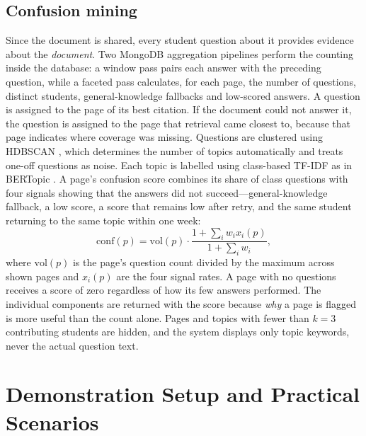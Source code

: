 \documentclass[conference]{IEEEtran}
\begin{document}
\subsection{Confusion mining}
\label{sec:mining}

Since the document is shared, every student question about it provides evidence about the
\emph{document}. Two MongoDB aggregation pipelines perform the counting inside the database: a
window pass pairs each answer with the preceding question, while a faceted pass calculates, for each
page, the number of questions, distinct students, general-knowledge fallbacks and low-scored
answers. A question is assigned to the page of its best citation. If the document could not answer
it, the question is assigned to the page that retrieval came closest to, because that page indicates
where coverage was missing. Questions are clustered using HDBSCAN
\cite{campello2013hdbscan}, which determines the number of topics automatically and treats one-off
questions as noise. Each topic is labelled using class-based TF-IDF as in BERTopic
\cite{grootendorst2022bertopic}. A page's confusion score combines its share of class questions with
four signals showing that the answers did not succeed---general-knowledge fallback, a low score,
a score that remains low after retry, and the same student returning to the same topic within one
week:
\begin{equation}
\mathrm{conf}(p) = \mathrm{vol}(p)\cdot\frac{1+\sum_i w_i x_i(p)}{1+\sum_i w_i},
\label{eq:conf}
\end{equation}
where $\mathrm{vol}(p)$ is the page's question count divided by the maximum across shown pages and
$x_i(p)$ are the four signal rates. A page with no questions receives a score of zero regardless of
how its few answers performed. The individual components are returned with the score because
\emph{why} a page is flagged is more useful than the count alone. Pages and topics with fewer than
$k{=}3$ contributing students are hidden, and the system displays only topic keywords, never the
actual question text.

\section{Demonstration Setup and Practical Scenarios}
\end{document}
